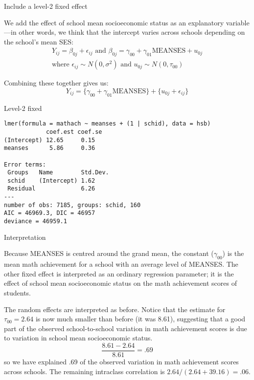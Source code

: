 \documentclass[10pt,ignorenonframetext,]{beamer}
\begin{document}
\begin{frame}{Include a level-2 fixed effect}

We add the effect of school mean socioeconomic status as an explanatory
variable---in other words, we think that the intercept varies across
schools depending on the school's mean SES: \[
\begin{gathered}
Y_{ij} = \beta_{0j} + \epsilon_{ij} \text{ and } \beta_{0j} =
    \gamma_{00} + \gamma_{01} \mathrm{MEANSES} + u_{0j}\\
\text{where } \epsilon_{ij} \sim N(0,\sigma^2) \text{ and } u_{0j} \sim N(0,\tau_{00})
\end{gathered}
\]

Combining these together gives us: \[
Y_{ij} = \{\gamma_{00} +\gamma_{01} \mathrm{MEANSES} \}+ \{u_{0j} + \epsilon_{ij} \}
\]

\end{frame}

\begin{frame}[fragile]{Level-2 fixed}

\footnotesize

\begin{verbatim}
lmer(formula = mathach ~ meanses + (1 | schid), data = hsb)
            coef.est coef.se
(Intercept) 12.65     0.15  
meanses      5.86     0.36  

Error terms:
 Groups   Name        Std.Dev.
 schid    (Intercept) 1.62    
 Residual             6.26    
---
number of obs: 7185, groups: schid, 160
AIC = 46969.3, DIC = 46957
deviance = 46959.1 
\end{verbatim}

\end{frame}

\begin{frame}{Interpretation}

Because MEANSES is centred around the grand mean, the constant
(\(\gamma_{00}\)) is the mean math achievement for a school with an
average level of MEANSES. The other fixed effect is interpreted as an
ordinary regression parameter; it is the effect of school mean
socioeconomic status on the math achievement scores of students.

The random effects are interpreted as before. Notice that the estimate
for \(\tau_{00} = 2.64\) is now much smaller than before (it was 8.61),
suggesting that a good part of the observed school-to-school variation
in math achievement scores is due to variation in school mean
socioeconomic status. \[
\frac{8.61 - 2.64}{8.61} = .69
\] so we have explained .69 of the observed variation in math
achievement scores across schools. The remaining intraclass correlation
is \(2.64/(2.64 + 39.16) = .06.\)

\end{frame}
\end{document}
